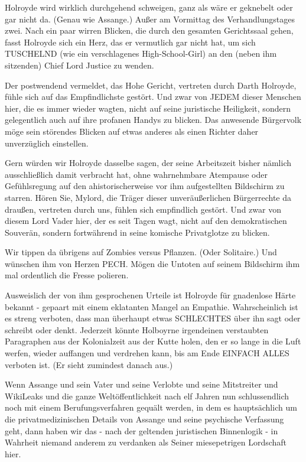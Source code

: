 \begin{multicols}{2}
Holroyde wird wirklich durchgehend schweigen, ganz
als wäre er geknebelt oder gar nicht da. (Genau wie Assange.) Außer am Vormittag des Verhandlungstages zwei.
Nach ein paar wirren Blicken, die durch den gesamten
Gerichtssaal gehen, fasst Holroyde sich ein Herz, das er
vermutlich gar nicht hat, um sich TUSCHELND (wie ein
verschlagenes High-School-Girl) an den (neben ihm sitzenden) Chief Lord Justice zu wenden.

Der postwendend vermeldet, das Hohe Gericht, vertreten durch Darth Holroyde, fühle sich auf das Empfindlichste gestört. Und zwar von JEDEM dieser Menschen
hier, die es immer wieder wagten, nicht auf seine juristische Heiligkeit, sondern gelegentlich auch auf ihre
profanen Handys zu blicken. Das anwesende Bürgervolk
möge sein störendes Blicken auf etwas anderes als einen
Richter daher unverzüglich einstellen.

Gern würden wir Holroyde dasselbe sagen, der seine Arbeitszeit bisher nämlich ausschließlich damit verbracht
hat, ohne wahrnehmbare Atempause oder Gefühlsregung auf den ahistorischerweise vor ihm aufgestellten
Bildschirm zu starren. Hören Sie, Mylord, die Träger
dieser unveräußerlichen Bürgerrechte da draußen, vertreten durch uns, fühlen sich empfindlich gestört. Und
zwar von diesem Lord Vader hier, der es seit Tagen wagt,
nicht auf den demokratischen Souverän, sondern fortwährend in seine komische Privatglotze zu blicken.

Wir tippen da übrigens auf Zombies versus Pflanzen.
(Oder Solitaire.) Und wünschen ihm von Herzen PECH.
Mögen die Untoten auf seinem Bildschirm ihm mal ordentlich die Fresse polieren.

Ausweislich der von ihm gesprochenen Urteile ist Holroyde für gnadenlose Härte bekannt - gepaart mit einem
eklatanten Mangel an Empathie. Wahrscheinlich ist es
streng verboten, dass man überhaupt etwas SCHLECHTES über ihn sagt oder schreibt oder denkt. Jederzeit
könnte Holboyrne irgendeinen verstaubten Paragraphen aus der Kolonialzeit aus der Kutte holen, den er so
lange in die Luft werfen, wieder auffangen und verdrehen kann, bis am Ende EINFACH ALLES verboten ist. (Er
sieht zumindest danach aus.)

Wenn Assange und sein Vater und seine Verlobte und
seine Mitstreiter und WikiLeaks und die ganze Weltöffentlichkeit nach elf Jahren nun schlussendlich noch mit
einem Berufungsverfahren gequält werden, in dem es
hauptsächlich um die privatmedizinischen Details von
Assange und seine psychische Verfassung geht, dann haben wir das - nach der geltenden juristischen Binnenlogik - in Wahrheit niemand anderem zu verdanken als
Seiner miesepetrigen Lordschaft hier.


\end{multicols}
